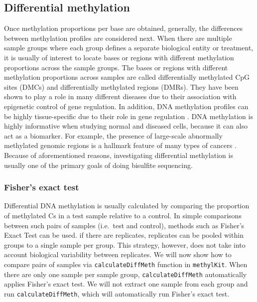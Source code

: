\documentclass[12pt,]{krantz}
\begin{document}
\hypertarget{differential-methylation}{%
\subsection{Differential methylation}\label{differential-methylation}}

Once methylation proportions per base are obtained, generally, the differences between methylation profiles are considered next. When there are multiple sample groups where each group defines a separate biological entity or treatment, it is usually of interest to locate bases or regions with different methylation proportions across the sample groups. The bases or regions with different methylation proportions across samples are called differentially methylated CpG sites (DMCs) and differentially methylated regions (DMRs). They have been shown to play a role in many different diseases due to their association with epigenetic control of gene regulation. In addition, DNA methylation profiles can be highly tissue-specific due to their role in gene regulation \citep{Schubeler2015-ai}. DNA methylation is highly informative when studying normal and diseased cells, because it can also act as a biomarker. For example, the presence of large-scale abnormally methylated genomic regions is a hallmark feature of many types of cancers \citep{Ehrlich2002-hv}. Because of aforementioned reasons, investigating differential methylation is usually one of the primary goals of doing bisulfite sequencing.

\hypertarget{fishers-exact-test}{%
\subsubsection{Fisher's exact test}\label{fishers-exact-test}}

Differential DNA methylation is usually calculated by comparing the proportion of methylated Cs in a test sample relative to a control. In simple comparisons between such pairs of samples (i.e.~test and control), methods such as Fisher's Exact Test can be used. if there are replicates, replicates can be pooled within groups to a single sample per group. This strategy, however, does not take into account biological variability between replicates. We will now show how to compare pairs of samples via \texttt{calculateDiffMeth} function in \texttt{methylKit}. When there are only one sample per sample group, \texttt{calculateDiffMeth} automatically applies Fisher's exact test. We will not extract one sample from each group and run \texttt{calculateDiffMeth}, which will automatically run Fisher's exact test.
\end{document}
